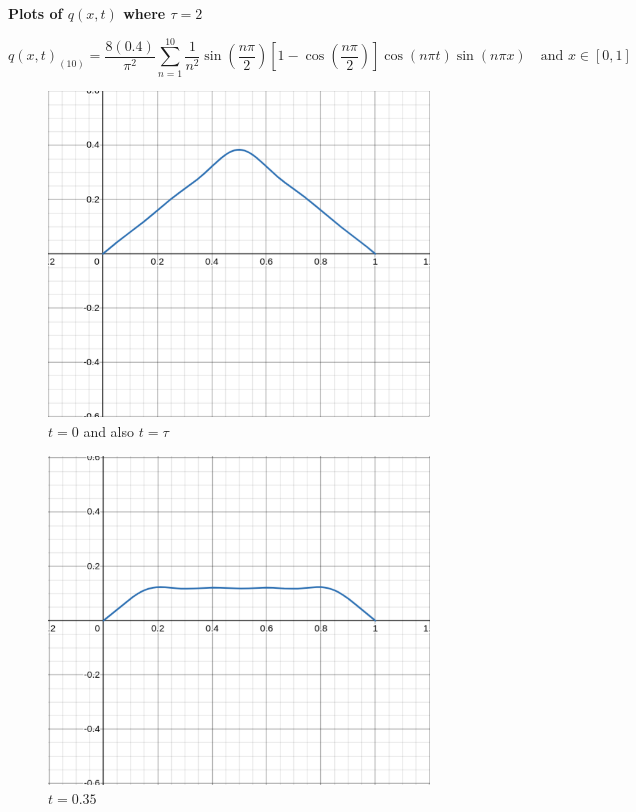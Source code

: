 \documentclass[letter]{article}
\begin{document}
\begin{center}
	{\huge \textbf{Plots of $q(x,t)$ where $\tau = 2$ }}
\end{center}
\[
\boxed{
q(x,t)_{(10)} = \frac{8 (0.4)}{\pi ^2 } 
\sum_{n=1}^{10} \frac{1}{n^2} \sin \left(\frac{n \pi }{2}\right) 
\left[ 
1 - \cos \left(\frac{n \pi }{2}\right)
\right] \cos \left( n \pi t\right) \sin (n \pi x) 
\quad \text{and } x \in [0,1]
}\]
\begin{minipage}{0.5\textwidth}
\begin{figure}[H]
	\centering
	\includegraphics[width=0.9\textwidth]{ss/c_n_001.png}
	\caption{$t = 0$ and also $t = \tau$}
	\label{fig:ss-c_n_001-png}
\end{figure}
\begin{figure}[H]
	\centering
	\includegraphics[width=0.9\textwidth]{ss/c_n_025.png}
	\caption{$t = 0.35$}
	\label{fig:ss-c_n_01-png}
\end{figure}
\end{minipage}
\end{document}

